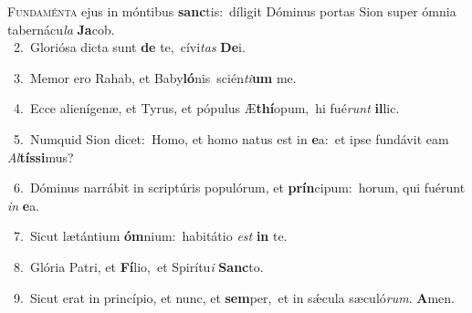 \lettrine{\initial\textcolor{\initialcolor}{F}}{undaménta} ejus in móntibus \textbf{sanc}\-tis:~\star díligit Dóminus portas Sion super ómnia tabernácu\textit{la} \textbf{Ja}\-cob.\\
{\numbfont\textcolor{\numbcolor}{~2.}}~Gloriósa dicta sunt \textbf{de} te,~\star cívi\textit{tas} \textbf{De}\-i.\par
{\numbfont\textcolor{\numbcolor}{~3.}}~Memor ero Rahab, et Baby\-\textbf{ló}\-nis~\star scién\-\textit{ti}\-\textbf{um} me.\par
{\numbfont\textcolor{\numbcolor}{~4.}}~Ecce alienígenæ, et Tyrus, et pópulus Æ\-\textbf{thí}\-opum,~\star hi fué\textit{runt} \textbf{il}\-lic.\par
{\numbfont\textcolor{\numbcolor}{~5.}}~Numquid Sion dicet:~\dagger Homo, et homo natus est in \textbf{e}\-a:~\star et ipse fundávit eam \textit{Al}\-\textbf{tís}\textbf{si}mus?\par
{\numbfont\textcolor{\numbcolor}{~6.}}~Dóminus narrábit in scriptúris populórum, et \textbf{prín}\-cipum:~\star horum, qui fuérunt \textit{in} \textbf{e}\-a.\par
{\numbfont\textcolor{\numbcolor}{~7.}}~Sicut lætántium \textbf{óm}\-nium:~\star habitátio \textit{est} \textbf{in} te.\par
{\numbfont\textcolor{\numbcolor}{~8.}}~Glória Patri, et \textbf{Fí}\-lio,~\star et Spirítu\textit{i} \textbf{Sanc}\-to.\par
{\numbfont\textcolor{\numbcolor}{~9.}}~Sicut erat in princípio, et nunc, et \textbf{sem}\-per,~\star et in sǽcula sæculó\-\textit{rum}\-. \textbf{A}\-men.\par
